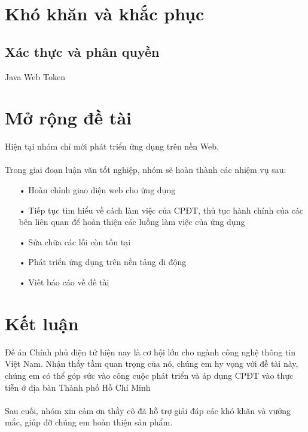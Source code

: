 \documentclass[a4paper]{article}
\begin{document}
\section{Khó khăn và khắc phục}
\subsection{Xác thực và phân quyền}
Java Web Token

\section{Mở rộng đề tài}
Hiện tại nhóm chỉ mới phát triển ứng dụng trên nền Web. \\ 
\\
Trong giai đoạn luận văn tốt nghiệp, nhóm sẽ hoàn thành các nhiệm vụ sau:
\begin{itemize}
	\item[•]Hoàn chỉnh giao diện web cho ứng dụng
	\item[•]Tiếp tục tìm hiểu về cách làm việc của CPĐT, thủ tục hành chính của các bên liên quan để hoàn thiện các luồng làm việc của ứng dụng
	\item[•]Sửa chữa các lỗi còn tồn tại
	\item[•]Phát triển ứng dụng trên nền tảng di động
	\item[•]Viết báo cáo về đề tài
\end{itemize}
\section{Kết luận}
Đề án Chính phủ điện tử hiện nay là cơ hội lớn cho ngành công nghệ thông tin Việt Nam. Nhận thấy tầm quan trọng của nó, chúng em hy vọng với đề tài này, chúng em có thể góp sức vào công cuộc phát triển và áp dụng CPĐT vào thực tiễn ở địa bàn Thành phố Hồ Chí Minh \\
\\
Sau cuối, nhóm xin cảm ơn thầy cô đã hỗ trợ giải đáp các khó khăn và vướng mắc, giúp đỡ chúng em hoàn thiện sản phẩm.

\newpage
\end{document}
